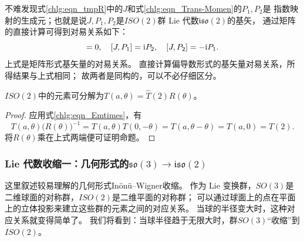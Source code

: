 不难发现式\eqref{chlg:eqn_tmpR}中的$J$和式\eqref{chlg:eqn_Trans-Momen}的$P_1,P_2$是
指数映射的生成元；也就是说$J,P_1,P_2$是$ISO(2)$群 Lie 代数$\mathfrak{iso}(2)$的基矢，
通过矩阵的直接计算可得到对易关系如下：
\begin{equation}
    [P_1,P_2]=0, \quad [J,P_1]=\i P_2,\quad
    [J,P_2]=-\i P_1.
\end{equation}
上式是矩阵形式基矢量的对易关系。
直接计算偏导数形式的基矢量对易关系，所得结果与上式相同；
故两者是同构的，可以不必仔细区分。

\begin{proposition}
    $ISO(2)$中的元素可分解为$T( a, \theta ) = \hat{T}(2) R(\theta) $。
\end{proposition}
\begin{proof}
    应用式\eqref{chlg:eqn_Emtimes}，有
    \begin{equation*}
        T( a, \theta ) \bigl(R(\theta) \bigr)^{-1}
        =T( a, \theta ) T( 0, -\theta )
        =T( a, \theta-\theta )
        =T( a, 0 )= T(2) .
    \end{equation*}
    将$R(\theta)$乘在上式两端便可证明命题。
\end{proof}

\subsubsection{Lie 代数收缩一：几何形式的\texorpdfstring{$\mathfrak{so}(3)\to \mathfrak{iso}(2)$}{so(3) → iso(2)}}
这里叙述较易理解的几何形式In\"on\"u--Wigner收缩。
作为 Lie 变换群，$SO(3)$是二维球面的对称群，$ISO(2)$是二维平面的对称群；
可以通过球面上的点在平面上的立体投影来建立这些群的元素之间的对应关系。
当球的半径变大时，这种对应关系就变得简单了。
我们将看到：当球半径趋于无限大时，群$SO(3)$“收缩”到$ISO(2)$。


